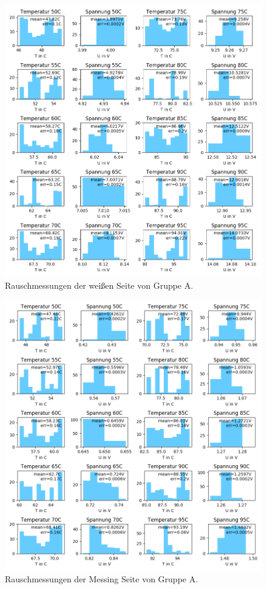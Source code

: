 \documentclass[12pt,a4paper]{article}
\begin{document}
\begin{figure}[h]
\includegraphics[scale=0.8]{Bilder/Rauschen_A_weiss_2.png}
\caption{Rauschmessungen der weißen Seite von Gruppe A.}
\label{fig:RegSpiegel}
\end{figure}

\begin{figure}[h]
\includegraphics[scale=0.8]{Bilder/Rauschen_A_messing_2.png}
\caption{Rauschmessungen der Messing Seite von Gruppe A.}
\label{fig:RegSpiegel}
\end{figure}
\end{document}
